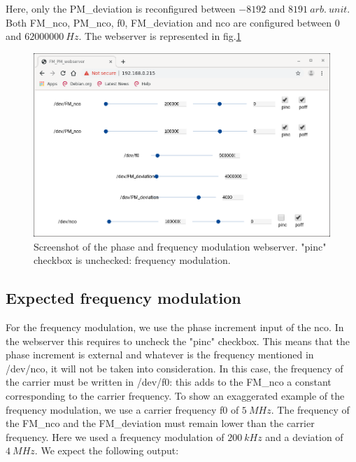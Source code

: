\documentclass[12pt,oneside]{article}
\begin{document}
Here, only the PM\_deviation is reconfigured between $-8192$ and $8191~arb.~unit$. Both FM\_nco, PM\_nco, f0, FM\_deviation and nco are configured between $0$ and $62000000~Hz$. The webserver is represented in fig.\ref{fig:FMPMwebserver}

\begin{figure}[h!tb]
	\begin{center}
		\vspace{0.5cm}
		\includegraphics[width=14cm,trim={0cm 0cm 0cm 0cm}, clip]{webserver/2020-01-07-090526_907x561_scrot.png}
		\caption{Screenshot of the phase and frequency modulation webserver. "pinc" checkbox is unchecked: frequency modulation.}
		\label{fig:FMPMwebserver}
	\end{center}
\end{figure}

\subsection{Expected frequency modulation}

For the frequency modulation, we use the phase increment input of the nco. In the webserver this requires to uncheck the "pinc" checkbox. This means that the phase increment is external and whatever is the frequency mentioned in /dev/nco, it will not be taken into consideration. In this case, the frequency of the carrier must be written in /dev/f0: this adds to the FM\_nco a constant corresponding to the carrier frequency. 
\newline\newline
To show an exaggerated example of the frequency modulation, we use a carrier frequency f0 of $5~MHz$. The frequency of the FM\_nco and the FM\_deviation must remain lower than the carrier frequency. Here we used a frequency modulation of $200~kHz$ and a deviation of $4~MHz$. We expect the following output: 
\end{document}
